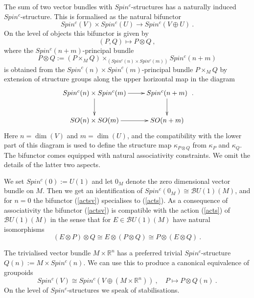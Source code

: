 \documentclass[12pt]{article}
\newcommand{\cB}{{\mathcal{B}}}
\newcommand{\R}{{\mathbb{R}}}
\begin{document}
The sum of two vector bundles with $Spin^{c}$-structures has a naturally induced  $Spin^{c}$-structure. This is formalised
 as the natural bifunctor
\begin{equation}\label{actsv} Spin^{c}(V)\times Spin^{c}(U)\to  Spin^{c}(V\oplus U)\ .\end{equation}
On the level of objects this bifunctor  is given by 
$$(P,Q)\mapsto P\otimes Q \ ,$$
 where the $Spin^{c}(n+m)$-principal bundle
\begin{equation}\label{actsglob}P\otimes Q:=(P\times_{M} Q)\times_{(Spin^{c}(n)\times Spin^{c}(m))}Spin^{c}(n+m)\end{equation}
is obtained from the 
$Spin^{c}(n)\times Spin^{c}(m)$-principal bundle $P\times_{M}Q$ by extension of structure groups along the upper horizontal map in the diagram
$$\xymatrix{Spin^{c}(n)\times Spin^{c}(m)\ar[d]\ar[r]&Spin^{c}(n+m)\ar[d]\\SO(n)\times SO(m)\ar[r]&SO(n+m)}\ .$$
Here $n=\dim(V)$ and $m=\dim(U)$, and  the compatibility with the lower part of this diagram is used to define the structure map
$\kappa_{P\otimes Q}$ from
$\kappa_{P}$ and $\kappa_{Q}$.
The bifunctor comes equipped with natural associativity constraints. We omit the details of the latter two aspects. 

We set $Spin^{c}(0):=U(1)$ and let $0_{M}$ denote the zero dimensional vector bundle on $M$.
 Then we get an identification of
$Spin^{c}(0_{M})\cong \cB U(1)(M)$, and for $n=0$  the bifunctor (\ref{actsv})
specialises to (\ref{acts}).
As a consequence of associativity the bifunctor (\ref{actsv}) is compatible with the action (\ref{acts}) of $\cB U(1)(M)$ in the sense that for $E\in \cB U(1)(M)$ have natural isomorphisms
\begin{equation}\label{actsglob1}(E\otimes P)\otimes Q\cong E\otimes (P\otimes Q)\cong P\otimes (E\otimes Q)\ .\end{equation}

The trivialised vector  bundle $M\times \R^{n}$ has a preferred trivial $Spin^{c}$-structure
$Q(n):=M\times Spin^{c}(n)$. We can use this to produce a canonical equivalence of groupoids
$$Spin^{c}(V)\cong Spin^{c}(V\oplus (M\times \R^{n}))\ ,  \quad P\mapsto P\otimes Q(n)\ .$$
On the level of $Spin^{c}$-structures we speak of stabilisations.
\end{document}
